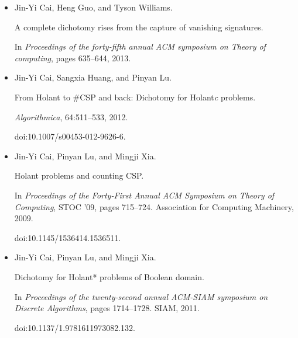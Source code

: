 \begin{itemize}
A complete dichotomy rises from the capture of vanishing signatures.


In \emph{Proceedings of the forty-fifth annual ACM symposium on Theory
of computing}, pages 635–644. Association for Computing Machinery, 2013.


doi:10.1145/2488608.2488687.





\item[] 
[12]

Jin-Yi Cai, Heng Guo, and Tyson Williams.


A complete dichotomy rises from the capture of vanishing signatures.


In \emph{Proceedings of the forty-fifth annual ACM symposium on Theory
of computing}, pages 635–644, 2013.





\item[] 
[13]

Jin-Yi Cai, Sangxia Huang, and Pinyan Lu.


From Holant to \#CSP and back: Dichotomy for Holant\emph{c}
problems.


\emph{Algorithmica}, 64:511–533, 2012.


doi:10.1007/s00453-012-9626-6.





\item[] 
[14]

Jin-Yi Cai, Pinyan Lu, and Mingji Xia.


Holant problems and counting CSP.


In \emph{Proceedings of the Forty-First Annual ACM Symposium on Theory
of Computing}, STOC ’09, pages 715–724. Association for Computing Machinery,
2009.


doi:10.1145/1536414.1536511.





\item[] 
[15]

Jin-Yi Cai, Pinyan Lu, and Mingji Xia.


Dichotomy for Holant* problems of Boolean domain.


In \emph{Proceedings of the twenty-second annual ACM-SIAM symposium on
Discrete Algorithms}, pages 1714–1728. SIAM, 2011.


doi:10.1137/1.9781611973082.132.






\end{itemize}
